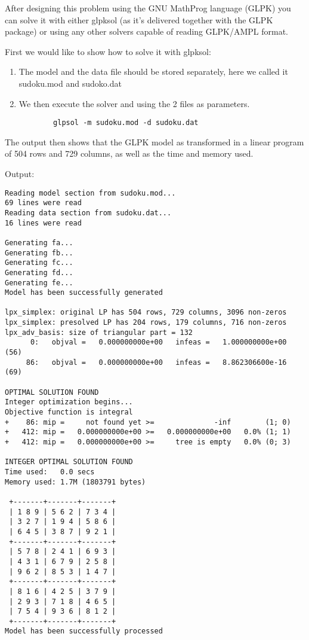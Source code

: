 After designing this problem using the GNU MathProg language (GLPK) you can solve it with either glpksol (as it's delivered together with the GLPK package) or using any other solvers capable of reading GLPK/AMPL format.

First we would like to show how to solve it with glpksol:

\begin{enumerate}
	\item The model and the data file should be stored separately, here we called it sudoku.mod and sudoko.dat
	\item We then execute the solver and using the 2 files as parameters.
	
		\begin{verbatim}
		glpsol -m sudoku.mod -d sudoku.dat
		\end{verbatim}
\end{enumerate}

The output then shows that the GLPK model as transformed in a linear program of 504 rows and 729 columns, as well as the time and memory used.

Output:
\begin{verbatim}
Reading model section from sudoku.mod...
69 lines were read
Reading data section from sudoku.dat...
16 lines were read

Generating fa...
Generating fb...
Generating fc...
Generating fd...
Generating fe...
Model has been successfully generated

lpx_simplex: original LP has 504 rows, 729 columns, 3096 non-zeros
lpx_simplex: presolved LP has 204 rows, 179 columns, 716 non-zeros
lpx_adv_basis: size of triangular part = 132
      0:   objval =   0.000000000e+00   infeas =   1.000000000e+00 (56)
     86:   objval =   0.000000000e+00   infeas =   8.862306600e-16 (69)
     
OPTIMAL SOLUTION FOUND
Integer optimization begins...
Objective function is integral
+    86: mip =     not found yet >=              -inf        (1; 0)
+   412: mip =   0.000000000e+00 >=   0.000000000e+00   0.0% (1; 1)
+   412: mip =   0.000000000e+00 >=     tree is empty   0.0% (0; 3)

INTEGER OPTIMAL SOLUTION FOUND
Time used:   0.0 secs
Memory used: 1.7M (1803791 bytes)

 +-------+-------+-------+
 | 1 8 9 | 5 6 2 | 7 3 4 |
 | 3 2 7 | 1 9 4 | 5 8 6 |
 | 6 4 5 | 3 8 7 | 9 2 1 |
 +-------+-------+-------+
 | 5 7 8 | 2 4 1 | 6 9 3 |
 | 4 3 1 | 6 7 9 | 2 5 8 |
 | 9 6 2 | 8 5 3 | 1 4 7 |
 +-------+-------+-------+
 | 8 1 6 | 4 2 5 | 3 7 9 |
 | 2 9 3 | 7 1 8 | 4 6 5 |
 | 7 5 4 | 9 3 6 | 8 1 2 |
 +-------+-------+-------+
Model has been successfully processed

\end{verbatim}
